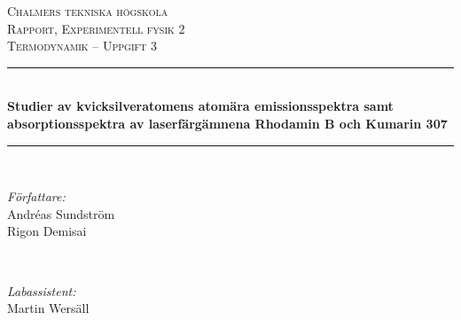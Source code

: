 \renewcommand{\thefootnote}{\fnsymbol{footnote}}

\newcommand{\andsunds}{andsunds@student.chalmers.se}
\newcommand{\rigon}{rigon@student.chalmers.se}



\begin{titlepage}

\newcommand{\HRule}{\rule{\linewidth}{0.5mm}} %

\center %
 

\textsc{\huge Chalmers tekniska högskola}\\[1.5cm] %
\textsc{\Large Rapport, Experimentell fysik 2}\\[0.2cm] %
\textsc{\large Termodynamik -- Uppgift 3 }\\[0.5cm] %


\HRule \\[0.4cm]
{ \LARGE \bfseries 
Studier av kvicksilveratomens atomära emissionsspektra samt absorptionsspektra av laserfärgämnena Rhodamin B och Kumarin 307
}\\[0.4cm] %
\HRule \\[1.5cm]
 

\begin{minipage}{0.4\textwidth}
\begin{flushleft} \large
\emph{Författare:}\\
Andréas Sundström\footnotemark{} \\
Rigon Demisai\footnotemark{} 
\end{flushleft}
\end{minipage}
~
\begin{minipage}{0.4\textwidth}
\begin{flushright} \large
\emph{Labassistent:} \\
Martin Wersäll
\end{flushright}
\end{minipage}\\[3cm]


\end{titlepage}
